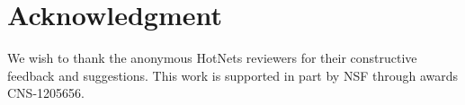 \section{Acknowledgment}
\label{sec:ack}
We wish to thank the anonymous HotNets reviewers for their constructive
feedback and suggestions. This work is supported in part by NSF through awards CNS-1205656.
